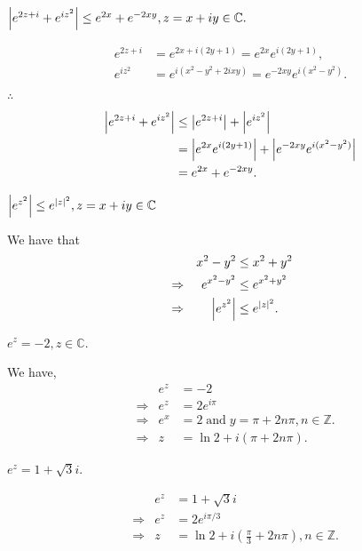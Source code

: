 \documentclass[12pt]{book}
\begin{document}
\begin{exmp}
    $\left\lvert e^{2z + i} + e^{iz^2} \right\rvert \leq e^{2x} + e^{-2xy}, z = x + iy \in \mathbb{C}.$
\end{exmp}
\begin{align*}
    e^{2z + i}  
        &= 
            e^{2x + i(2y + 1)}
        = 
            e^{2x}e^{i(2y + 1)}, \\
    e^{iz^2}
        &=
            e^{i(x^2 - y^2 + 2ixy)}
        =
            e^{-2xy}e^{i(x^2 - y^2)}.\\   
\end{align*}
$\therefore$
\begin{align*}
    \left\lvert e^{2z + i} + e^{iz^2} \right\rvert
        &\leq
            \left\lvert e^{2z + i} \right\rvert + \left\lvert e^{iz^2} \right\rvert \\
        &=
            \left\lvert e^{2x}e^{i(2y + 1)} \right\rvert + \left\lvert e^{-2xy}e^{i(x^2 - y^2)} \right\rvert \\
        &=
            e^{2x} + e^{-2xy}.
\end{align*}

\begin{exmp}
    $\left\lvert e^{z^2} \right\rvert \leq e^{\left\lvert z \right\rvert^2}, z = x + iy \in \mathbb{C}$ 
\end{exmp}
We have that 
\begin{align*}
    &&x^2 - y^2 
        &\leq 
            x^2 + y^2 \\
    &\Rightarrow &e^{x^2 - y^2}
        &\leq
            e^{x^2 + y^2} \\
    &\Rightarrow &\left\lvert e^{z^{2}} \right\rvert
        &\leq
            e^{\left\lvert z \right\rvert^2}.
\end{align*}

\begin{exmp}
    $e^{z} = -2, z \in \mathbb{C}.$
\end{exmp}
We have,
\begin{align*}
    &&e^{z}
        &=
            -2 \\
    &\Rightarrow &e^{z}
        &=
            2e^{i\pi} \\
    &\Rightarrow &e^{x}
        &= 
            2\;
    \text{and}\;
    y
        =
            \pi + 2n\pi, n \in \mathbb{Z}. \\
    &\Rightarrow &z
        &= 
            \ln 2 + i(\pi + 2n\pi).
\end{align*}

\begin{exmp}
    $e^{z} = 1 + \sqrt{3}i.$
\end{exmp}
\begin{align*}
    &&e^{z}
        &=
            1 + \sqrt{3}i \\
    &\Rightarrow &e^{z}
        &=
            2e^{i\pi/3} \\
    &\Rightarrow &z
        &=
            \ln 2 + i\left(\frac{\pi}{3} + 2n\pi\right), n \in \mathbb{Z}.
\end{align*}
\end{document}
